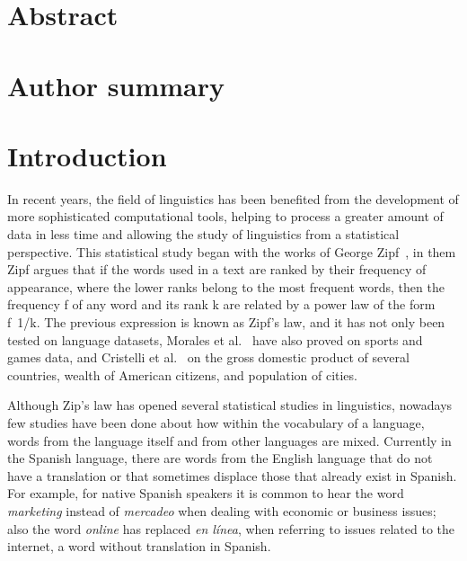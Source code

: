 \documentclass[10pt,letterpaper]{article} %
\begin{document}
\section*{Abstract} %
\section*{Author summary} %
\linenumbers
\section*{Introduction} %

 
In recent years, the field of linguistics has been benefited from the
development of more sophisticated computational tools, helping to process a
greater amount of data in less time and allowing the study of linguistics  from
a statistical perspective.  This statistical study began with the works of
George Zipf~\cite{Zipf}, in them Zipf argues that if  the words used in a text
are ranked by their frequency of appearance,  where the lower ranks belong to
the most frequent words,  then the frequency  f  of any word and its rank  k
are related by a power law of the form f~1/k. The previous expression is known
as  Zipf’s law, and it has not only been tested on language datasets,  Morales
et al.~\cite{Morales} have also proved on sports and games data,  and
Cristelli et al.~\cite{cristelli} on the gross domestic product of several
countries,  wealth of American citizens,  and population of cities.
 
Although Zip’s law has opened several statistical studies in linguistics,
nowadays few studies have been done about how within the vocabulary of a
language, words from the language itself and from other languages are
mixed.
Currently in the Spanish language, there are words from the English language
that do not have a translation or that sometimes displace those that already
exist in Spanish.  For example, for native Spanish speakers it is common to
hear the word \textit{marketing} instead of \textit{mercadeo}  when dealing
with economic or
business issues; also the word \textit{online} has replaced \textit{en línea}, when referring to
issues related to the internet, a word without translation in Spanish.
 
\end{document}
